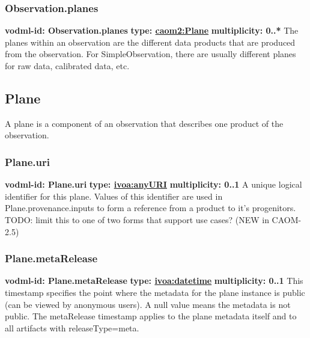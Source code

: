     \subsubsection{Observation.planes}
      \textbf{vodml-id: Observation.planes} \newline
      \textbf{type: \hyperref[sect:Plane]{caom2:Plane}} \newline
      \textbf{multiplicity: 0..*} \newline
      The planes within an observation are the different data products that are produced from the observation. For SimpleObservation, there are usually different planes for raw data, calibrated data, etc.

  \subsection{Plane}
  \label{sect:Plane}
    A plane is a component of an observation that describes one product of the observation.

    \subsubsection{Plane.uri}
      \textbf{vodml-id: Plane.uri} \newline
      \textbf{type: \hyperref[sect:ivoa]{ivoa:anyURI}} \newline
      \textbf{multiplicity: 0..1} \newline
      A unique logical identifier for this plane. Values of this identifier are used in Plane.provenance.inputs to form a reference from a product to it's progenitors. TODO: limit this to one of two forms that support use cases? (NEW in CAOM-2.5)

    \subsubsection{Plane.metaRelease}
      \textbf{vodml-id: Plane.metaRelease} \newline
      \textbf{type: \hyperref[sect:ivoa]{ivoa:datetime}} \newline
      \textbf{multiplicity: 0..1} \newline
      This timestamp specifies the point where the metadata for the plane instance is public (can be viewed by anonymous users). A null value means the metadata is not public. The metaRelease timestamp applies to the plane metadata itself and to all artifacts with releaseType=meta.

